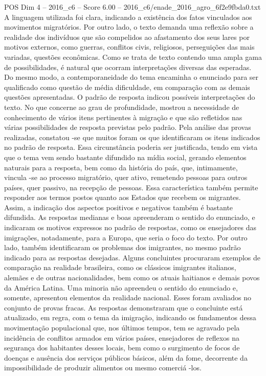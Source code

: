 \begin{textsample}{POS Dim 4 – 2016\_c6 – Score 6.00 – 2016\_c6/enade\_2016\_agro\_6f2e9fbda0.txt}
A linguagem utilizada foi clara, indicando a existência dos fatos vinculados aos movimentos migratórios.
Por outro lado, o texto demanda uma reflexão sobre a realidade dos indivíduos que são compelidos ao afastamento dos seus lares por motivos externos, como guerras, conflitos civis, religiosos, perseguições das mais variadas, questões econômicas.
Como se trata de texto contendo uma ampla gama de possibilidades, é natural que ocorram interpretações diversas das esperadas.
Do mesmo modo, a contemporaneidade do tema encaminha o enunciado para ser qualificado como questão de média dificuldade, em comparação com as demais questões apresentadas.
O padrão de resposta indicou possíveis interpretações do texto.
No que concerne ao grau de profundidade, mostrou a necessidade de conhecimento de vários itens pertinentes à migração e que são refletidos nas várias possibilidades de resposta previstas pelo padrão.
Pela análise das provas realizadas, constatou -se que muitos foram os que identificaram os itens indicados no padrão de resposta.
Essa circunstância poderia ser justificada, tendo em vista que o tema vem sendo bastante difundido na mídia social, gerando elementos naturais para a resposta, bem como da história do país, que, intimamente, vincula -se ao processo migratório, quer ativo, remetendo pessoas para outros países, quer passivo, na recepção de pessoas.
Essa característica também permite responder aos termos postos quanto aos Estados que recebem os migrantes.
Assim, a indicação dos aspectos positivos e negativos também é bastante difundida.
As respostas medianas e boas apreenderam o sentido do enunciado, e indicaram os motivos expressos no padrão de respostas, como os ensejadores das imigrações, notadamente, para a Europa, que seria o foco do texto.
Por outro lado, também identificaram os problemas dos imigrantes, no mesmo padrão indicado para as respostas desejadas.
Alguns concluintes procuraram exemplos de comparação na realidade brasileira, como os clássicos imigrantes italianos, alemães e de outras nacionalidades, bem como os atuais haitianos e demais povos da América Latina.
Uma minoria não apreendeu o sentido do enunciado e, somente, apresentou elementos da realidade nacional.
Esses foram avaliados no conjunto de provas fracas.
As respostas demonstraram que o concluinte está atualizado, em regra, com o tema da imigração, indicando os fundamentos dessa movimentação populacional que, nos últimos tempos, tem se agravado pela incidência de conflitos armados em vários países, ensejadores de reflexos na segurança dos habitantes desses locais, bem como o surgimento de focos de doenças e ausência dos serviços públicos básicos, além da fome, decorrente da impossibilidade de produzir alimentos ou mesmo comerciá -los.

\end{textsample}

